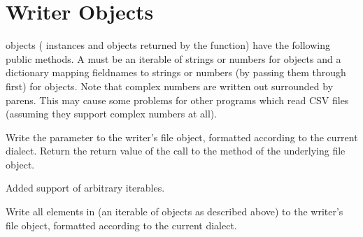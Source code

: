 \documentclass[letterpaper,10pt,english]{sphinxmanual}
\begin{document}
\section{Writer Objects}
\label{\detokenize{csv:writer-objects}}
 objects ({\hyperref[\detokenize{csv:csv.DictWriter}]{}} instances and objects returned by
the {\hyperref[\detokenize{csv:csv.writer}]{}} function) have the following public methods.  A  must be
an iterable of strings or numbers for  objects and a dictionary
mapping fieldnames to strings or numbers (by passing them through 
first) for {\hyperref[\detokenize{csv:csv.DictWriter}]{}} objects.  Note that complex numbers are written
out surrounded by parens. This may cause some problems for other programs which
read CSV files (assuming they support complex numbers at all).

\vspace{5px}

\begin{fulllineitems}
\label{\detokenize{csv:csv.csvwriter.writerow}}
Write the  parameter to the writer’s file object, formatted according to
the current dialect. Return the return value of the call to the  method
of the underlying file object.

Added support of arbitrary iterables.

\end{fulllineitems}


\vspace{5px}

\begin{fulllineitems}
\label{\detokenize{csv:csv.csvwriter.writerows}}
Write all elements in  (an iterable of  objects as described
above) to the writer’s file object, formatted according to the current
dialect.

\end{fulllineitems}
\end{document}
